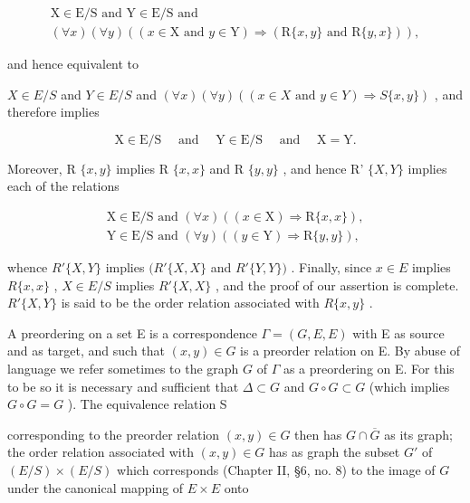 \[
\begin{array}{l} \mathrm{X} \in \mathrm{E} / \mathrm{S} \text { and } \mathrm{Y} \in \mathrm{E} / \mathrm{S} \text { and } \\ (\forall x) (\forall y) ((x \in \mathrm{X} \text { and } y \in \mathrm{Y}) \Longrightarrow (\mathrm{R} \{x, y \} \text { and } \mathrm{R} \{y, x \})), \end{array}
\]

and hence equivalent to

\(X \in E/S\) and \(Y \in E/S\) and \((\forall x)(\forall y)((x \in X \text{ and } y \in Y) \Longrightarrow S\{x, y\})\) , and therefore implies

\[
\mathrm{X} \in \mathrm{E} / \mathrm{S} \quad \text { and } \quad \mathrm{Y} \in \mathrm{E} / \mathrm{S} \quad \text { and } \quad \mathrm{X} = \mathrm{Y}.
\]

Moreover, R \(\{x, y\}\) implies R \(\{x, x\}\) and R \(\{y, y\}\) , and hence R' \(\{X, Y\}\) implies each of the relations

\[
\begin{array}{l} \mathrm{X} \in \mathrm{E} / \mathrm{S} \text { and } (\forall x) ((x \in \mathrm{X}) \Longrightarrow \mathrm{R} \{x, x \}), \\ \mathrm{Y} \in \mathrm{E} / \mathrm{S} \text { and } (\forall y) ((y \in \mathrm{Y}) \Longrightarrow \mathrm{R} \{y, y \}), \end{array}
\]

whence \(R'\{X,Y\}\) implies \((R'\{X,X\}\) and \(R'\{Y,Y\})\) . Finally, since \(x \in E\) implies \(R\{x,x\}\) , \(X \in E/S\) implies \(R'\{X,X\}\) , and the proof of our assertion is complete. \(R'\{X,Y\}\) is said to be the order relation associated with \(R\{x,y\}\) .

A preordering on a set E is a correspondence \(\Gamma = (G, E, E)\) with E as source and as target, and such that \((x, y) \in G\) is a preorder relation on E. By abuse of language we refer sometimes to the graph \(G\) of \(\Gamma\) as a preordering on E. For this to be so it is necessary and sufficient that \(\Delta \subset G\) and \(G \circ G \subset G\) (which implies \(G \circ G = G\) ). The equivalence relation S

corresponding to the preorder relation \((x, y) \in G\) then has \(G \cap \overline{G}\) as its graph; the order relation associated with \((x, y) \in G\) has as graph the subset \(G'\) of \((E/S) \times (E/S)\) which corresponds (Chapter II, §6, no. 8) to the image of \(G\) under the canonical mapping of \(E \times E\) onto

